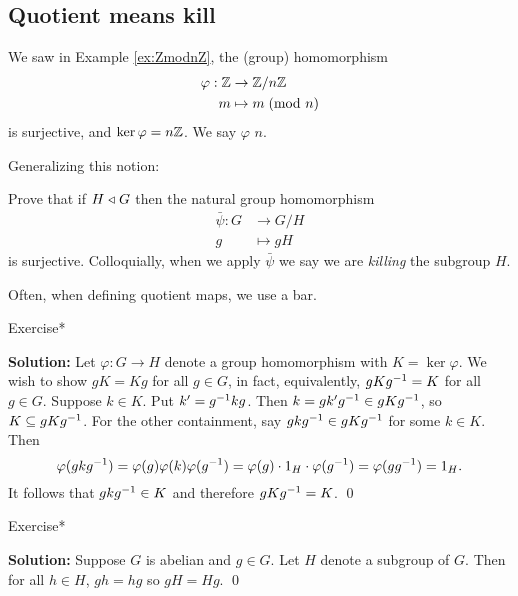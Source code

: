 \documentclass[../algebraNotesMSRI-UP2016.tex]{subfiles}
\begin{document}
\subsection[\subsecname]{Quotient means kill}\label{subsec:quotientMeansKill}
\begin{frame}[c]{\subsecname}
We saw in Example \ref{ex:ZmodnZ}, the (group) homomorphism
\begin{align*}
\varphi : \mathbb Z &\to \mathbb Z/n\mathbb Z \\
m &\mapsto m\;(\text{mod } n)
\end{align*}
is surjective, and $\ker{\varphi}=n\mathbb Z$.  We say $\varphi$  $n$.  
\end{frame}

\begin{frame}[c]
Generalizing this notion:
\begin{UNABexe}[cf. Problem 73]\label{exe:prob73}
Prove that if $H\mathrel{\triangleleft} G$ then the natural group homomorphism 
\begin{align*}
\bar{\psi}: G &\to G/H \\
	g &\mapsto gH
\end{align*}
is surjective.  Colloquially, when we apply $\bar{\psi}$ we say we are \emph{killing} the subgroup $H$. 
\end{UNABexe}

\smallGap
Often, when defining quotient maps, we use a bar.
\end{frame}

\answerKey
\begin{frame}{\subsecname}
\begin{block}{Exercise*}\end{block}
\vspace{-0.75pc}
\textbf{Solution:} Let $\varphi:G\to H$ denote a group homomorphism with $K=\ker\varphi$.  We wish to show $gK=Kg$ for all $g\in G$, in fact, equivalently, $gKg^{-1}=K$ for all $g\in G$.  Suppose $k\in K$.  Put $k'=g^{-1}kg$.  Then $k=gk'g^{-1}\in gKg^{-1}$, so $K\subseteq gKg^{-1}$.  For the other containment, say $gkg^{-1}\in gKg^{-1}$ for some $k\in K$.  Then 
\[
\varphi(gkg^{-1})=\varphi(g)\varphi(k)\varphi(g^{-1})=\varphi(g)\cdot 1_H\cdot \varphi(g^{-1})=\varphi(gg^{-1})=1_H.
\]
It follows that $gkg^{-1}\in K$ and therefore $gKg^{-1}=K$.
\qed

\smallGap
\begin{block}{Exercise*}\end{block}
\vspace{-0.75pc}
\textbf{Solution:}  Suppose $G$ is abelian and $g\in G$.  Let $H$ denote a subgroup of $G$.  Then for all $h\in H$, $gh=hg$ so $gH=Hg$.
\qed
\end{frame}
\end{document}
